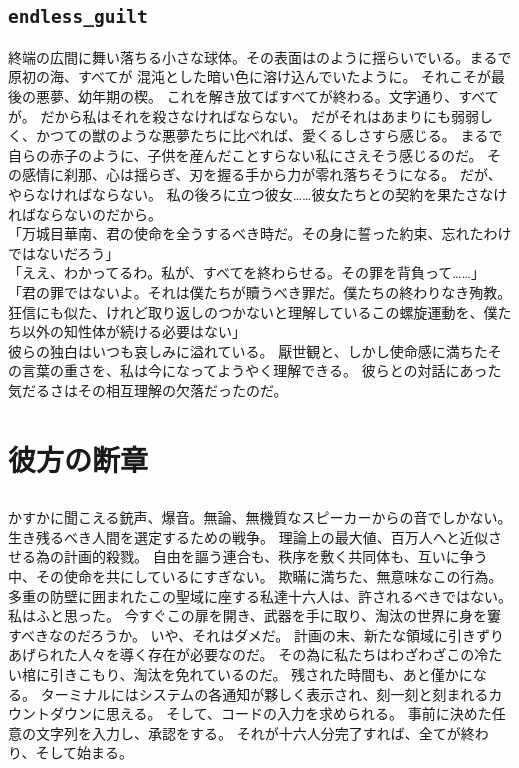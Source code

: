 \documentclass[autodetect-engine,dvipdfmx-if-dvi,a5paper,ja=standard,twoside,titlepage,final,twocolumn]{ltjtbook}
\begin{document}
\section{\tt \large endless\_guilt}
終端の広間に舞い落ちる小さな球体。その表面はのように揺らいでいる。まるで原初の海、すべてが
混沌とした暗い色に溶け込んでいたように。
それこそが最後の悪夢、幼年期の楔。
これを解き放てばすべてが終わる。文字通り、すべてが。
だから私はそれを殺さなければならない。
だがそれはあまりにも弱弱しく、かつての獣のような悪夢たちに比べれば、愛くるしさすら感じる。
まるで自らの赤子のように、子供を産んだことすらない私にさえそう感じるのだ。
その感情に刹那、心は揺らぎ、刃を握る手から力が零れ落ちそうになる。
だが、やらなければならない。
私の後ろに立つ彼女……彼女たちとの契約を果たさなければならないのだから。\\
「万城目華南、君の使命を全うするべき時だ。その身に誓った約束、忘れたわけではないだろう」\\
「ええ、わかってるわ。私が、すべてを終わらせる。その罪を背負って……」\\
「君の罪ではないよ。それは僕たちが贖うべき罪だ。僕たちの終わりなき殉教。
狂信にも似た、けれど取り返しのつかないと理解しているこの螺旋運動を、僕たち以外の知性体が続ける必要はない」\\
彼らの独白はいつも哀しみに溢れている。
厭世観と、しかし使命感に満ちたその言葉の重さを、私は今になってようやく理解できる。
彼らとの対話にあった気だるさはその相互理解の欠落だったのだ。

\chapter{\rm 彼方の断章}
\section{}
かすかに聞こえる銃声、爆音。無論、無機質なスピーカーからの音でしかない。
生き残るべき人間を選定するための戦争。
理論上の最大値、百万人へと近似させる為の計画的殺戮。
自由を謳う連合も、秩序を敷く共同体も、互いに争う中、その使命を共にしているにすぎない。
欺瞞に満ちた、無意味なこの行為。
多重の防壁に囲まれたこの聖域に座する私達十六人は、許されるべきではない。
私はふと思った。
今すぐこの扉を開き、武器を手に取り、淘汰の世界に身を窶すべきなのだろうか。
いや、それはダメだ。
計画の末、新たな領域に引きずりあげられた人々を導く存在が必要なのだ。
その為に私たちはわざわざこの冷たい棺に引きこもり、淘汰を免れているのだ。
残された時間も、あと僅かになる。
ターミナルにはシステムの各通知が夥しく表示され、刻一刻と刻まれるカウントダウンに思える。
そして、コードの入力を求められる。
事前に決めた任意の文字列を入力し、承認をする。
それが十六人分完了すれば、全てが終わり、そして始まる。
\end{document}
